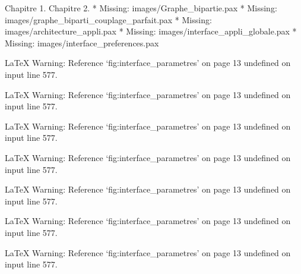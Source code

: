 Chapitre 1.
Chapitre 2.
* Missing: images/Graphe_bipartie.pax
* Missing: images/graphe_biparti_couplage_parfait.pax
* Missing: images/architecture_appli.pax
* Missing: images/interface_appli_globale.pax
* Missing: images/interface_preferences.pax

LaTeX Warning: Reference `fig:interface_parametres' on page 13 undefined on input line 577.


LaTeX Warning: Reference `fig:interface_parametres' on page 13 undefined on input line 577.


LaTeX Warning: Reference `fig:interface_parametres' on page 13 undefined on input line 577.


LaTeX Warning: Reference `fig:interface_parametres' on page 13 undefined on input line 577.


LaTeX Warning: Reference `fig:interface_parametres' on page 13 undefined on input line 577.


LaTeX Warning: Reference `fig:interface_parametres' on page 13 undefined on input line 577.


LaTeX Warning: Reference `fig:interface_parametres' on page 13 undefined on input line 577.





































































































